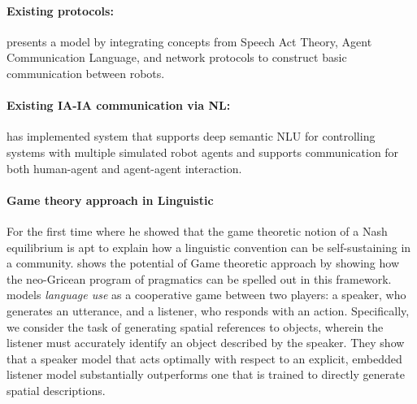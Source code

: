\documentclass{article}
\begin{document}
\begin{multicols}{2}
		
		
		\paragraph{Existing protocols:}
		\cite{doerschuk-2006-communication-language-for-autonomous-multi-robot-systems} presents a model by integrating concepts from Speech Act Theory, Agent Communication Language, and network protocols  to construct basic communication between robots.
		
		
		
		\paragraph{Existing IA-IA communication via NL:} \citet{trott-2015-natural-language-understanding-and-communication-for-multi-agent-systems}  has implemented system that supports deep semantic NLU for controlling systems with multiple simulated robot agents and  supports communication for both human-agent and agent-agent interaction. 
		
		\paragraph{Game theory approach in Linguistic} For the first time \citet{lewis-1969-convention} where he showed that the game theoretic notion of a Nash equilibrium is apt to explain how a linguistic convention can be self-sustaining in a community. \citet{jager-2012-game-theory-in-semantics-and-pragmatics} shows the potential of Game theoretic approach by showing how the neo-Gricean program of pragmatics can be spelled out in this framework. \citet{golland-2010-a-game-theoretic-approach-to-generating-spatial-descriptions} models \textit{language use} as a cooperative game between two players: a speaker, who generates an utterance, and a listener, who responds with an action. Specifically, we consider the task of generating spatial references to objects, wherein the listener must accurately identify an object described by the speaker. They show that a speaker model that acts optimally with respect to an explicit, embedded listener model substantially outperforms one that is trained to directly generate spatial descriptions.
		
	
	
	
	\end{multicols}
\end{document}
